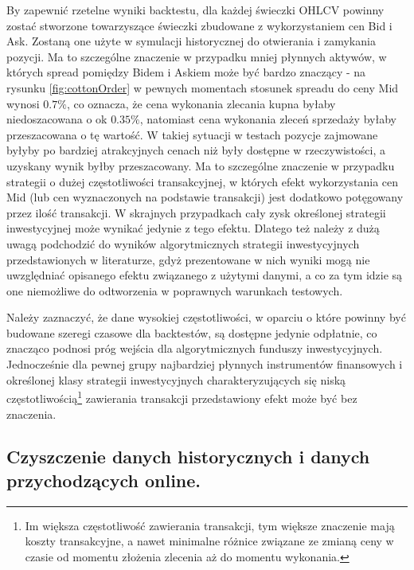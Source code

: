 \documentclass[a4paper,12pt,openany, DIV=calc, headsepline]{scrbook}
\begin{document}
By zapewnić rzetelne wyniki backtestu, dla każdej świeczki OHLCV powinny zostać stworzone towarzyszące świeczki zbudowane z wykorzystaniem cen Bid i Ask. Zostaną one użyte w symulacji historycznej do otwierania i zamykania pozycji. Ma to szczególne znaczenie w przypadku mniej płynnych aktywów, w których spread pomiędzy Bidem i Askiem może być bardzo znaczący - na rysunku \ref{fig:cottonOrder} w pewnych momentach stosunek spreadu do ceny Mid wynosi $0.7\%$, co oznacza, że cena wykonania zlecania kupna byłaby niedoszacowana o ok $0.35\%$, natomiast cena wykonania zleceń sprzedaży byłaby przeszacowana o tę wartość. W takiej sytuacji w testach pozycje zajmowane byłyby po bardziej atrakcyjnych cenach niż były dostępne w rzeczywistości, a uzyskany wynik byłby przeszacowany. Ma to szczególne znaczenie w przypadku strategii o dużej częstotliwości transakcyjnej, w których efekt wykorzystania cen Mid (lub cen wyznaczonych na podstawie transakcji) jest dodatkowo potęgowany przez ilość transakcji. W skrajnych przypadkach cały zysk określonej strategii inwestycyjnej może wynikać jedynie z tego efektu. Dlatego też należy z dużą uwagą podchodzić do wyników algorytmicznych strategii inwestycyjnych przedstawionych w literaturze, gdyż prezentowane w nich wyniki mogą nie uwzględniać opisanego efektu związanego z użytymi danymi, a co za tym idzie są one niemożliwe do odtworzenia w poprawnych warunkach testowych. 

Należy zaznaczyć, że dane wysokiej częstotliwości, w oparciu o które powinny być budowane szeregi czasowe dla backtestów, są dostępne jedynie odpłatnie, co znacząco podnosi próg wejścia dla algorytmicznych funduszy inwestycyjnych. Jednocześnie dla pewnej grupy najbardziej płynnych instrumentów finansowych i określonej klasy strategii inwestycyjnych charakteryzujących się niską częstotliwością\footnote{Im większa częstotliwość zawierania transakcji, tym większe znaczenie mają koszty transakcyjne, a nawet minimalne różnice związane ze zmianą ceny w czasie od momentu złożenia zlecenia aż do momentu wykonania.} zawierania transakcji przedstawiony efekt może być bez znaczenia.

\subsection{Czyszczenie danych historycznych i danych przychodzących online.}
\end{document}
